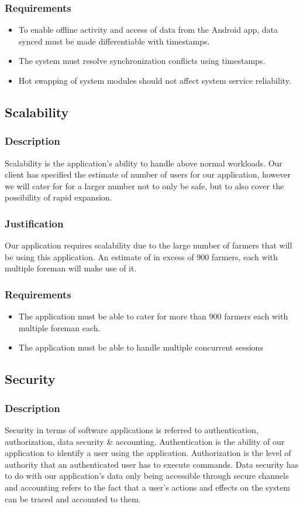 \documentclass[11pt,fleqn]{book} %
\begin{document}
			\subsubsection{Requirements}
			\begin{itemize}
				\item To enable offline activity and access of data from the Android app, data synced must be made differentiable with timestamps.
				\item The system must resolve synchronization conflicts using timestamps.
				\item Hot swapping of system modules should not affect system service reliability.
			\end{itemize}
		\subsection{Scalability}
			\subsubsection{Description}
				Scalability is the application’s ability to handle above normal workloads. Our client has specified the estimate of number of users for our application, however we will cater for for a larger number not to only be safe, but to also cover the possibility of rapid expansion.
			\subsubsection{Justification}
				Our application requires scalability due to the large number of farmers that will be using this application. An estimate of in excess of 900 farmers, each with multiple foreman will make use of it.
			\subsubsection{Requirements}
				\begin{itemize}
					\item The application must be able to cater for more than 900 farmers each with multiple foreman each.
					\item The application must be able to handle multiple concurrent sessions
				\end{itemize}
		\subsection{Security}
			\subsubsection{Description}
				Security in terms of software applications is referred to authentication, authorization, data security \& accounting. Authentication is the ability of our application to identify a user using the application. Authorization is the level of authority that an authenticated user has to execute commands. Data security has to do with our application’s data only being accessible through secure channels and accounting refers to the fact that a user’s actions and effects on the system can be traced and accounted to them.
\end{document}
